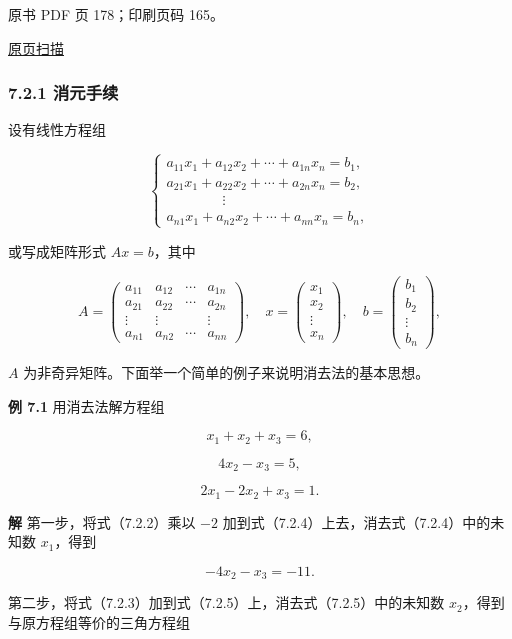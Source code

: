 \clearpage

原书 PDF 页 178；印刷页码 165。

\href{source-images/pdf-178.jpeg}{原页扫描}

\subsubsection{7.2.1 消元手续}\label{ch07a-ux6d88ux5143ux624bux7eed}

设有线性方程组

\[
\begin{cases}
a_{11}x_1+a_{12}x_2+\cdots+a_{1n}x_n=b_1,\\
a_{21}x_1+a_{22}x_2+\cdots+a_{2n}x_n=b_2,\\
\qquad\qquad\vdots\\
a_{n1}x_1+a_{n2}x_2+\cdots+a_{nn}x_n=b_n,
\end{cases}
\tag{7.2.1}
\]

或写成矩阵形式 \(Ax=b\)，其中

\[
A=\begin{pmatrix}
a_{11}&a_{12}&\cdots&a_{1n}\\
a_{21}&a_{22}&\cdots&a_{2n}\\
\vdots&\vdots&&\vdots\\
a_{n1}&a_{n2}&\cdots&a_{nn}
\end{pmatrix},\quad
x=\begin{pmatrix}x_1\\x_2\\\vdots\\x_n\end{pmatrix},\quad
b=\begin{pmatrix}b_1\\b_2\\\vdots\\b_n\end{pmatrix},
\]

\(A\) 为非奇异矩阵。下面举一个简单的例子来说明消去法的基本思想。

\textbf{例 7.1} 用消去法解方程组

\[x_1+x_2+x_3=6,\tag{7.2.2}\]

\[4x_2-x_3=5,\tag{7.2.3}\]

\[2x_1-2x_2+x_3=1.\tag{7.2.4}\]

\textbf{解} 第一步，将式（7.2.2）乘以 \(-2\) 加到式（7.2.4）上去，消去式（7.2.4）中的未知数 \(x_1\)，得到

\[-4x_2-x_3=-11.\tag{7.2.5}\]

第二步，将式（7.2.3）加到式（7.2.5）上，消去式（7.2.5）中的未知数 \(x_2\)，得到与原方程组等价的三角方程组

